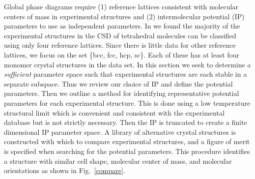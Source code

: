 \documentclass[preprint]{revtex4}
\begin{document}
Global phase diagrams require (1) reference lattices consistent with
molecular centers of mass in experimental structures and (2)
intermolecular potential (IP) parameters to use as independent
parameters. In \cite{McClurg08} we found the majority of the
experimental structures in the CSD of tetrahedral molecules can be
classified using only four reference lattices. Since there is little
data for other reference lattices, we focus on the set \{bcc, fcc,
hcp, sc\}. Each of these has at least four monomer
crystal structures in the data set. In this section we seek to
determine a \emph{sufficient} parameter space such that experimental
structures are each stable in a separate subspace. Thus we review
our choice of IP and define the potential parameters.  Then we
outline a method for identifying representative potential parameters
for each experimental structure. This is done using a low
temperature structural limit which is convenient and consistent with the experimental database but is not strictly necessary.  Then
the IP is truncated to create a finite dimensional IP parameter
space.  A library of alternative crystal structures is constructed
with which to compare experimental structures, and a figure of merit
is specified when searching for the potential parameters. This
procedure identifies a structure with similar cell shape, molecular
center of mass, and molecular orientations as shown in
Fig.~\ref{compare}.


\end{document}
